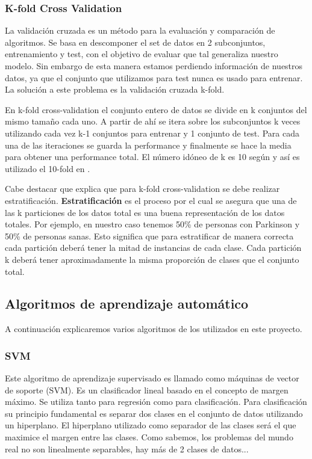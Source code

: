 \subsubsection{K-fold Cross Validation \cite{CrossVal}}
La validación cruzada es un método para la evaluación y comparación de algoritmos. Se basa en descomponer el set de datos en 2 subconjuntos, entrenamiento y test, con el objetivo de evaluar que tal generaliza nuestro modelo. Sin embargo de esta manera estamos perdiendo información de nuestros datos, ya que el conjunto que utilizamos para test nunca es usado para entrenar. La solución a este problema es la validación cruzada k-fold.

En k-fold cross-validation el conjunto entero de datos se divide en k conjuntos del mismo tamaño cada uno. A partir de ahí se itera sobre los subconjuntos k veces utilizando cada vez k-1 conjuntos para entrenar y 1 conjunto de test. Para cada una de las iteraciones se guarda la performance y finalmente se hace la media para obtener una performance total. El número idóneo de k es 10 según \cite{CrossVal} y así es utilizado el 10-fold en \cite{Orz2016}.


Cabe destacar que \cite{CrossVal} explica que para k-fold cross-validation se debe realizar estratificación. \textbf{Estratificación} es el proceso por el cual se asegura que una de las k particiones de los datos total es una buena representación de los datos totales. Por ejemplo, en nuestro caso tenemos 50\% de personas con Parkinson y 50\% de personas sanas. Esto significa que para estratificar de manera correcta cada partición deberá tener la mitad de instancias de cada clase. Cada partición k deberá tener aproximadamente la misma proporción de clases que el conjunto total.

\subsection{Algoritmos de aprendizaje automático}

A continuación explicaremos varios algoritmos de los utilizados en este proyecto.

\subsubsection{SVM \cite{svmexpl}}

Este algoritmo de aprendizaje supervisado es llamado como máquinas de vector de soporte (SVM). Es un clasificador lineal basado en el concepto de margen máximo. Se utiliza tanto para regresión como para clasificación. Para clasificación su principio fundamental es separar dos clases en el conjunto de datos utilizando un hiperplano. El hiperplano utilizado como separador de las clases será el que maximice el margen entre las clases. Como sabemos, los problemas del mundo real no son linealmente separables, hay más de 2 clases de datos... 

